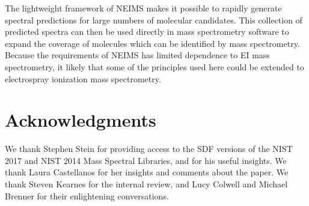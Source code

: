 The lightweight framework of NEIMS makes it possible to rapidly generate spectral predictions for large numbers of molecular candidates. This collection of predicted spectra can then be used directly in mass spectrometry software to expand the coverage of molecules which can be identified by mass spectrometry. Because the requirements of NEIMS has limited dependence to EI mass spectrometry, it likely that some of the principles used here could be extended to electrospray ionization mass spectrometry.

\section{Acknowledgments}
We thank Stephen Stein for providing access to the SDF versions of the NIST 2017 and NIST 2014 Mass Spectral Libraries, and for his useful insights. We thank Laura Castellanos for her insights and comments about the paper. We thank Steven Kearnes for the internal review, and Lucy Colwell and Michael Brenner for their enlightening conversations.
